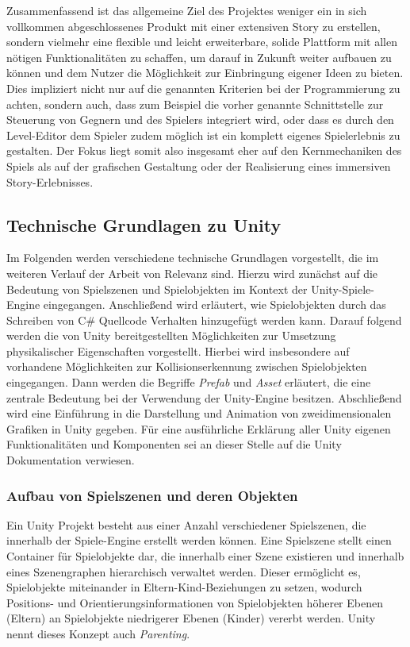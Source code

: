 Zusammenfassend ist das allgemeine Ziel des Projektes weniger ein in sich vollkommen abgeschlossenes Produkt mit einer extensiven Story zu erstellen, sondern vielmehr eine flexible und leicht erweiterbare, solide Plattform mit allen nötigen Funktionalitäten zu schaffen, um darauf in Zukunft weiter aufbauen zu können und dem Nutzer die Möglichkeit zur Einbringung eigener Ideen zu bieten. Dies impliziert nicht nur auf die genannten Kriterien bei der Programmierung zu achten, sondern auch, dass zum Beispiel die vorher genannte Schnittstelle zur Steuerung von Gegnern und des Spielers integriert wird, oder dass es durch den Level-Editor dem Spieler zudem möglich ist ein komplett eigenes Spielerlebnis zu gestalten. Der Fokus liegt somit also insgesamt eher auf den Kernmechaniken des Spiels als auf der grafischen Gestaltung oder der Realisierung eines immersiven Story-Erlebnisses.

\subsection{Technische Grundlagen zu Unity}\label{sec:unityBasics}

Im Folgenden werden verschiedene technische Grundlagen vorgestellt, die im weiteren Verlauf der Arbeit von Relevanz sind. Hierzu wird zunächst auf die Bedeutung von Spielszenen und Spielobjekten im Kontext der Unity-Spiele-Engine eingegangen. Anschließend wird erläutert, wie Spielobjekten durch das Schreiben von C\# Quellcode Verhalten hinzugefügt werden kann. Darauf folgend werden die von Unity bereitgestellten Möglichkeiten zur Umsetzung physikalischer Eigenschaften vorgestellt. Hierbei wird insbesondere auf vorhandene Möglichkeiten zur Kollisionserkennung zwischen Spielobjekten eingegangen. Dann werden die Begriffe \textit{Prefab} und \textit{Asset} erläutert, die eine zentrale Bedeutung bei der Verwendung der Unity-Engine besitzen. Abschließend wird eine Einführung in die Darstellung und Animation von zweidimensionalen Grafiken in Unity gegeben. Für eine ausführliche Erklärung aller Unity eigenen Funktionalitäten und Komponenten sei an dieser Stelle auf die Unity Dokumentation \cite{Unity_Doc_Main} verwiesen.


\subsubsection{Aufbau von Spielszenen und deren Objekten}\label{sec:unityScenes}

Ein Unity Projekt besteht aus einer Anzahl verschiedener Spielszenen, die innerhalb der Spiele-Engine erstellt werden können. Eine Spielszene stellt einen Container für Spielobjekte dar, die innerhalb einer Szene existieren und innerhalb eines Szenengraphen hierarchisch verwaltet werden. Dieser ermöglicht es, Spielobjekte miteinander in Eltern-Kind-Beziehungen zu setzen, wodurch Positions- und Orientierungsinformationen von Spielobjekten höherer Ebenen (Eltern) an Spielobjekte niedrigerer Ebenen (Kinder) vererbt werden. Unity nennt dieses Konzept auch \textit{Parenting}.

